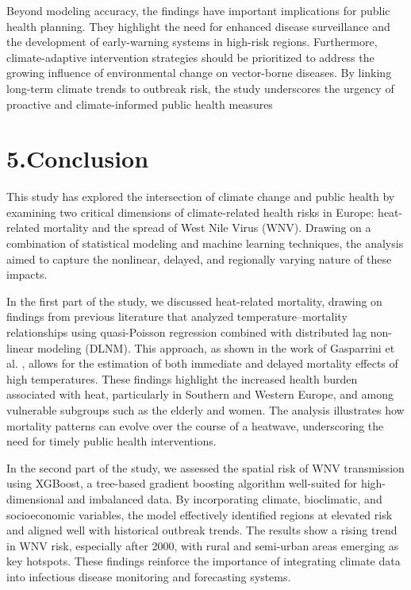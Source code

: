 \documentclass[
]{krantz}
\begin{document}
Beyond modeling accuracy, the findings have important implications for public health planning. They highlight the need for enhanced disease surveillance and the development of early-warning systems in high-risk regions. Furthermore, climate-adaptive intervention strategies should be prioritized to address the growing influence of environmental change on vector-borne diseases. By linking long-term climate trends to outbreak risk, the study underscores the urgency of proactive and climate-informed public health measures

\chapter{5.Conclusion}\label{conclusion-1}

This study has explored the intersection of climate change and public health by examining two critical dimensions of climate-related health risks in Europe: heat-related mortality and the spread of West Nile Virus (WNV). Drawing on a combination of statistical modeling and machine learning techniques, the analysis aimed to capture the nonlinear, delayed, and regionally varying nature of these impacts.

In the first part of the study, we discussed heat-related mortality, drawing on findings from previous literature that analyzed temperature--mortality relationships using quasi-Poisson regression combined with distributed lag non-linear modeling (DLNM). This approach, as shown in the work of Gasparrini et al. \citep{gasparrini2015}, allows for the estimation of both immediate and delayed mortality effects of high temperatures. These findings highlight the increased health burden associated with heat, particularly in Southern and Western Europe, and among vulnerable subgroups such as the elderly and women. The analysis illustrates how mortality patterns can evolve over the course of a heatwave, underscoring the need for timely public health interventions.

In the second part of the study, we assessed the spatial risk of WNV transmission using XGBoost, a tree-based gradient boosting algorithm well-suited for high-dimensional and imbalanced data. By incorporating climate, bioclimatic, and socioeconomic variables, the model effectively identified regions at elevated risk and aligned well with historical outbreak trends. The results show a rising trend in WNV risk, especially after 2000, with rural and semi-urban areas emerging as key hotspots. These findings reinforce the importance of integrating climate data into infectious disease monitoring and forecasting systems.
\end{document}
